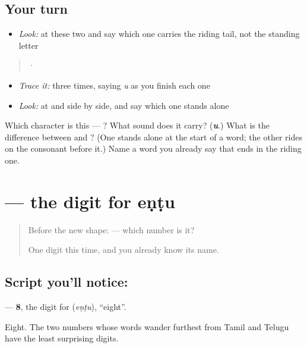 \subsection*{Your turn}
\begin{itemize}
\raggedright
  \item \emph{Look:} at these two and say which one carries the riding tail, not the standing letter
\end{itemize}

\begin{quote}
  ·  
\end{quote}

\begin{itemize}
\raggedright
  \item \emph{Trace it:}  three times, saying \emph{u} as you finish each one
  \item \emph{Look:} at  and  side by side, and say which one stands alone
\end{itemize}

\begin{tcolorbox}[breakable,colback=teal!4,colframe=teal!35!black,title={Before you move on}]
Which character is this — ? What sound does it carry? (\emph{\textbf{u}}.) What is the difference between  and ? (One stands alone at the start of a word; the other rides on the consonant before it.) Name a word you already say that ends in the riding one.
\end{tcolorbox}
\section[\texorpdfstring{\kn{೮} (8)}{೮ (8)}]{ — the digit for eṇṭu}

\label{lesson:KA-S147-digit-eight}



\begin{quote}
Before the new shape: \textbf{} — which number is it?

One digit this time, and you already know its name.
\end{quote}

\subsection*{Script you'll notice: }
\textbf{} — \textbf{8}, the digit for \textbf{} (\emph{eṇṭu}), \textquotedblleft{}eight\textquotedblright{}.

Eight. The two numbers whose words wander furthest from Tamil and Telugu have the least surprising digits.

